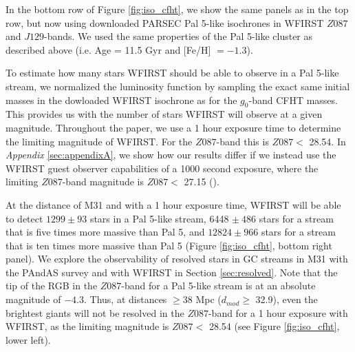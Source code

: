 \documentclass[twocolumn]{aastex62}
\begin{document}
In the bottom row of Figure \ref{fig:iso_cfht}, we show the same panels as in the top row, but now using downloaded PARSEC Pal 5-like isochrones in WFIRST $Z087$ and $J129$-bands. We used the same properties of the Pal 5-like cluster as described above (i.e. Age = 11.5 Gyr and [Fe/H] $= -1.3$). 

To estimate how many stars WFIRST should be able to observe in a Pal 5-like stream, we normalized the luminosity function by sampling the exact same initial masses in the dowloaded WFIRST isochrone as for the $g_0$-band CFHT masses. This provides us with the number of stars WFIRST will observe at a given magnitude. Throughout the paper, we use a 1 hour exposure time to determine the limiting magnitude of WFIRST.  For the $Z087$-band this is $Z087 <$ 28.54. In {\it Appendix} \ref{sec:appendixA}, we show how our results differ if we instead use the WFIRST guest observer capabilities of a 1000 second exposure, where the limiting $Z087$-band magnitude is  $Z087 <$ 27.15 (\citealt{spergel13}). 

At the distance of M31 and with a 1 hour exposure time, WFIRST will be able to detect $1299\pm 93$ stars in a Pal 5-like stream,  6448 $\pm~ 486$ stars for a stream that is five times more massive than Pal 5, and $12824 \pm 966$ stars for a stream that is ten times more massive than Pal 5 (Figure \ref{fig:iso_cfht}, bottom right panel). 
We explore the observability of resolved stars in GC streams in M31 with the PAndAS survey and with WFIRST in Section \ref{sec:resolved}. 
Note that the tip of the RGB in the $Z087$-band for a Pal 5-like stream is at an absolute magnitude of $-4.3$. Thus, at distances $\geq$38 Mpc ($d_{mod} \geq$ 32.9), even the brightest giants will not be resolved in the $Z087$-band for a 1 hour exposure with WFIRST, as the limiting magnitude is $Z087 <$  28.54 (see Figure \ref{fig:iso_cfht}, lower left). 
\end{document}

